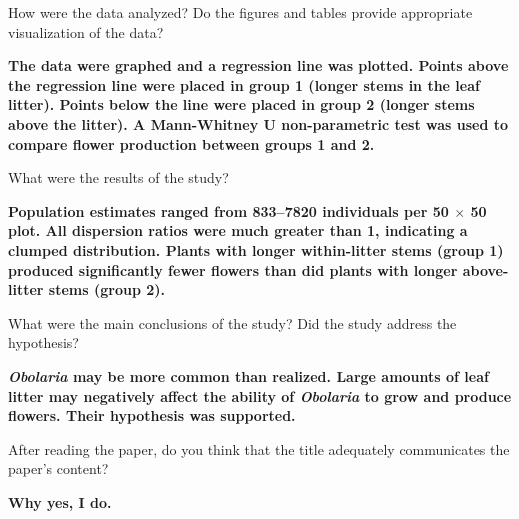 \documentclass[12pt, hidelinks, addpoints]{exam}
\newcommand*\AnswerBox[2]{%
    \parbox[t][#1]{0.92\textwidth}{%
    \vspace{-0.5\baselineskip}\begin{solution}\textbf{#2}\end{solution}}
}
\newlength{\basespace}
\begin{document}
\begin{questions}
\question[1]
How were the data analyzed? Do the figures and tables provide
appropriate visualization of the data?

\AnswerBox{1.75\basespace}{The data were graphed and a regression line was plotted. Points above the regression line were placed in group 1 (longer stems in the leaf litter). Points below the line were placed in group 2 (longer stems above the litter). A Mann-Whitney U non-parametric test was used to compare flower production between groups 1 and 2.}

\question[1]
What were the results of the study?

\AnswerBox{1.75\basespace}{Population estimates ranged from 833--7820 individuals per 50 $\times$ 50 plot. All dispersion ratios were much greater than 1, indicating a clumped distribution. Plants with longer within-litter stems (group 1) produced significantly fewer flowers than did plants with longer above-litter stems (group 2).}

\question[1]
What were the main conclusions of the study? Did the study address the hypothesis?

\AnswerBox{\basespace}{\textit{Obolaria} may be more common than realized. Large amounts of leaf litter may negatively affect the ability of \textit{Obolaria} to grow and produce flowers. Their hypothesis was supported.}

\question[1]
After reading the paper, do you think that the title adequately
communicates the paper's content?

\AnswerBox{\baselineskip}{Why yes, I do.}


\end{questions}
\end{document}
